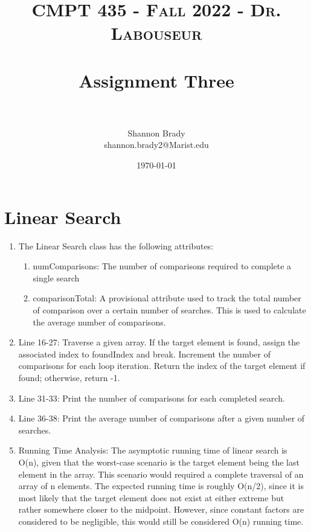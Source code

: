 \documentclass[letterpaper, 10pt,DIV=13]{scrartcl}
\title{	
   \normalfont \normalsize 
   \textsc{CMPT 435 - Fall 2022 - Dr. Labouseur} \\[10pt] %
   \horrule{0.5pt} \\[0.25cm] 	     %
   \huge Assignment Three  \\     	 %
   \horrule{0.5pt} \\[0.25cm] 	     %
}
\author{Shannon Brady \\ \normalsize shannon.brady2@Marist.edu}
\date{\normalsize\today} 	%
\numberwithin{equation}{section} %
\numberwithin{figure}{section} %
\numberwithin{table}{section} %
\begin{document}
\maketitle %

\section{Linear Search}
\begin{enumerate}
    \item The Linear Search class has the following attributes:
    \begin{enumerate}
        \item numComparisons: The number of comparisons required to complete a single search
        \item comparisonTotal: A provisional attribute used to track the total number of comparison over a certain number of searches. This is used to calculate the average number of comparisons. 
    \end{enumerate}
    \item Line 16-27: Traverse a given array. If the target element is found, assign the associated index to foundIndex and break. Increment the number of comparisons for each loop iteration. Return the index of the target element if found; otherwise, return -1.
    \item Line 31-33: Print the number of comparisons for each completed search.
    \item Line 36-38: Print the average number of comparisons after a given number of searches.
    \item Running Time Analysis: The asymptotic running time of linear search is O(n), given that the worst-case scenario is the target element being the last element in the array. This scenario would required a complete traversal of an array of n elements. The expected running time is roughly O(n/2), since it is most likely that the target element does not exist at either extreme but rather somewhere closer to the midpoint. However, since constant factors are considered to be negligible, this would still be considered O(n) running time.
\end{enumerate}
\end{document}
